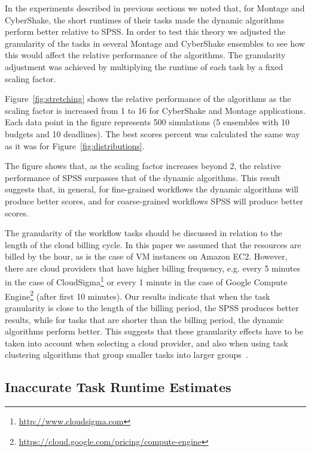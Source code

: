 \documentclass[preprint,5p]{elsarticle}
\begin{document}
In the experiments described in previous sections we noted that, for Montage and
CyberShake, the short runtimes of their tasks made the dynamic algorithms
perform better relative to SPSS. In order to test this theory we adjusted the
granularity of the tasks in several Montage and CyberShake ensembles to see how
this would affect the relative performance of the algorithms. The granularity
adjustment was achieved by multiplying the runtime of each task by a fixed
scaling factor.

Figure~\ref{fig:stretching} shows the relative performance of the algorithms as
the scaling factor is increased from 1 to 16 for CyberShake  and Montage
applications. Each data point in the figure represents 500 simulations (5
ensembles with 10 budgets and 10 deadlines). The best scores percent was
calculated the same way as it was for Figure~\ref{fig:distributions}.

The figure shows that, as the scaling factor increases beyond 2, the relative
performance of SPSS surpasses that of the dynamic algorithms.  This result
suggests that, in general, for fine-grained workflows the dynamic algorithms
will produce better scores, and for coarse-grained workflows SPSS will produce
better scores.

The granularity of the workflow tasks should be discussed in relation to the
length of the cloud billing cycle. In this paper we assumed that the resources
are billed by the hour, as is the case of VM instances on Amazon EC2.
However, there are cloud providers that have higher billing frequency, e.g.
every 5 minutes in the case of
CloudSigma\footnote{\url{http://www.cloudsigma.com}} or every 1 minute in the
case of Google Compute
Engine\footnote{\url{https://cloud.google.com/pricing/compute-engine}} (after
first 10 minutes). Our results indicate that when the task granularity is close
to the length of the billing period, the SPSS produces better results, while for
tasks that are shorter than the billing period, the dynamic algorithms perform
better. This suggests that these granularity effects have to be taken into account when
selecting a cloud provider, and also when using task clustering algorithms that
group smaller tasks into larger groups~\cite{ChenD12}.



\subsection{Inaccurate Task Runtime Estimates}
\label{sec:variances}
\end{document}
